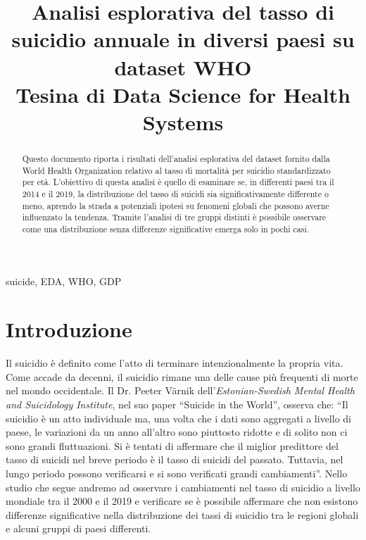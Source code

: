 \documentclass[conference]{IEEEtran}
\begin{document}
\title{Analisi esplorativa del tasso di suicidio annuale in diversi paesi su dataset WHO\\
{\footnotesize Tesina di Data Science for Health Systems}
}

\author{
}

\maketitle

\begin{abstract}
Questo documento riporta i risultati dell'analisi esplorativa del dataset fornito dalla
World Health Organization relativo al tasso di mortalità per suicidio standardizzato per età.
L'obiettivo di questa analisi è quello di esaminare se, in differenti paesi tra il 2014 e il 2019,
la distribuzione del tasso di suicidi sia significativamente differente o meno,
aprendo la strada a potenziali
ipotesi su fenomeni globali che possono averne influenzato la tendenza.
Tramite l'analisi di tre gruppi distinti è possibile osservare come una
distribuzione senza differenze significative emerga solo in pochi casi.
\end{abstract}

\begin{IEEEkeywords}
suicide, EDA, WHO, GDP
\end{IEEEkeywords}

\section{Introduzione}
Il suicidio è definito come l'atto di terminare intenzionalmente la propria vita\cite{b1}.
Come accade da decenni, il suicidio rimane una delle cause più
frequenti di morte nel mondo occidentale\cite{b2}.
Il Dr. Peeter V\"arnik dell'\emph{Estonian-Swedish Mental Health
and Suicidology Institute}, nel suo paper ``Suicide in the World''\cite{b3}, 
osserva che:
``Il suicidio è un atto individuale ma, una volta che i dati sono aggregati a
livello di paese, le variazioni da un anno all'altro sono piuttosto ridotte e
di solito non ci sono grandi fluttuazioni. Si è tentati di affermare che
il miglior predittore del tasso di suicidi nel breve periodo è il tasso di suicidi del passato.
Tuttavia, nel lungo periodo possono verificarsi e si sono verificati grandi cambiamenti''.
Nello studio che segue andremo ad osservare i cambiamenti nel tasso di suicidio 
a livello mondiale tra il 2000 e il 2019 e verificare se è possibile affermare
che non esistono differenze significative nella distribuzione dei tassi di suicidio
tra le regioni globali e alcuni gruppi di paesi differenti.
\end{document}
